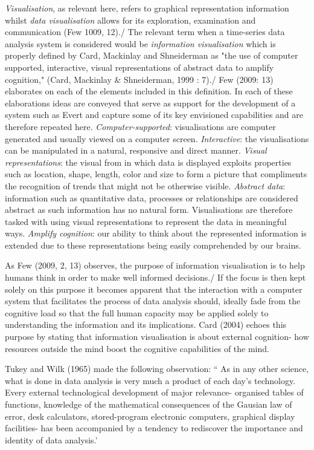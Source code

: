 \documentclass[a4paper,12pt]{article}
\begin{document}
\emph{Visualisation}, as relevant here, refers to graphical representation information whilst
 \emph{data visualisation} allows for its exploration, examination and communication (Few 1009, 12)./
 The relevant term when a time-series data analysis system is considered would be \emph{information visualisation}
 which is properly defined by Card, Mackinlay and Shneiderman as "the use of computer supported,
 interactive, visual representations of abstract data to amplify cognition," (Card, Mackinlay & Shneiderman, 1999 : 7)./
 Few (2009: 13) elaborates on each of the elements included in this definition.
 In each of these elaborations ideas are conveyed that serve as support for the development of a system such as Evert and 
 capture some of its key envisioned capabilities and are therefore repeated here.
 	\emph{Computer-supported}: visualisations are computer generated and usually viewed on a computer screen.
	\emph{Interactive}: the visualisations can be manipulated in a natural, responsive and direct manner.
	\emph{Visual representations}: the visual from in which data is displayed exploits properties such as location,
        shape, length, color and size to form a picture that compliments the recognition of trends that might not be otherwise
        visible.
	\emph{Abstract data}: information such as quantitative data, processes or relationships are considered abstract as
        such information has no natural form.
        Visualisations are therefore tasked with using visual representations to represent the data in meaningful ways.
	\emph{Amplify cognition}: our ability to think about the represented information is extended
        due to these representations being easily comprehended by our brains.
	
 As Few (2009, 2, 13) observes, the purpose of information visualisation is to help humans think in order to make well informed decisions./
 If the focus is then kept solely on this purpose it becomes apparent that the interaction with a computer system
 that facilitates the process of data analysis should,
 ideally fade from the cognitive load so that the full human capacity may be applied solely to understanding the information
 and its implications.
 Card (2004) echoes this purpose by stating that information visualisation is about external cognition- how resources outside the mind
 boost the cognitive capabilities of the mind.
 
 Tukey and Wilk (1965) made the following observation:
 `` As in any other science, what is done in data analysis is very much a product of each day's technology.
 Every external technological development of major relevance- organised tables of functions, knowledge of the mathematical consequences of
 the Gausian law of error, desk calculators, stored-program electronic computers, graphical display facilities-
 has been accompanied by a tendency to rediscover the importance and identity of data analysis.'
\end{document}
